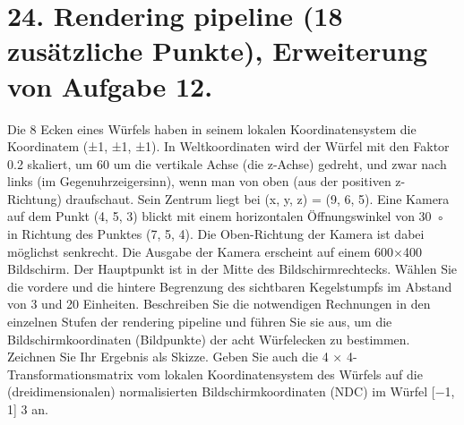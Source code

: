 \documentclass[11pt]{article}
\begin{document}
\section*{24. Rendering pipeline (18 zusätzliche Punkte), Erweiterung von Aufgabe 12.}
Die 8 Ecken eines Würfels haben in seinem lokalen Koordinatensystem die Koordinatem (±1, ±1, ±1). In Weltkoordinaten wird der Würfel mit den Faktor 0.2 skaliert, um 60 um die vertikale Achse (die z-Achse) gedreht, und zwar nach links (im Gegenuhrzeigersinn), wenn man von oben (aus der positiven z-Richtung) draufschaut. Sein Zentrum liegt bei (x, y, z) = (9, 6, 5). Eine Kamera auf dem Punkt (4, 5, 3) blickt mit einem horizontalen Öffnungswinkel von 30 ◦ in Richtung des Punktes (7, 5, 4). Die Oben-Richtung der Kamera ist dabei möglichst senkrecht. Die Ausgabe der Kamera erscheint auf einem 600×400 Bildschirm. Der Hauptpunkt ist in der Mitte des Bildschirmrechtecks. Wählen Sie die vordere und die hintere Begrenzung des sichtbaren Kegelstumpfs im Abstand von 3 und 20 Einheiten. Beschreiben Sie die notwendigen Rechnungen in den einzelnen Stufen der rendering pipeline und führen Sie sie aus, um die Bildschirmkoordinaten (Bildpunkte) der acht Würfelecken zu bestimmen. Zeichnen Sie Ihr Ergebnis als Skizze. Geben Sie auch die 4 × 4-Transformationsmatrix vom lokalen Koordinatensystem des Würfels auf die (dreidimensionalen) normalisierten Bildschirmkoordinaten (NDC) im Würfel [−1, 1] 3 an.
\end{document}
